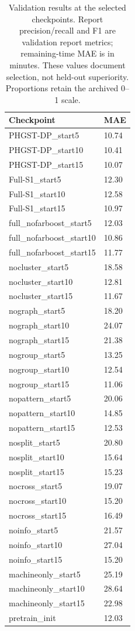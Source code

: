 \begin{table}[p]
\centering\scriptsize
\caption{Validation results at the selected checkpoints. Report precision/recall and F1 are validation report metrics; remaining-time MAE is in minutes. These values document selection, not held-out superiority. Proportions retain the archived 0--1 scale.}
\begin{tabularx}{\textwidth}{lX}
\toprule
Checkpoint & MAE \\
\midrule
PHGST-DP\_start5 & 10.74 \\
PHGST-DP\_start10 & 10.41 \\
PHGST-DP\_start15 & 10.07 \\
Full-S1\_start5 & 12.30 \\
Full-S1\_start10 & 12.58 \\
Full-S1\_start15 & 10.97 \\
full\_nofarboost\_start5 & 12.03 \\
full\_nofarboost\_start10 & 10.86 \\
full\_nofarboost\_start15 & 11.77 \\
nocluster\_start5 & 18.58 \\
nocluster\_start10 & 12.81 \\
nocluster\_start15 & 11.67 \\
nograph\_start5 & 18.20 \\
nograph\_start10 & 24.07 \\
nograph\_start15 & 21.38 \\
nogroup\_start5 & 13.25 \\
nogroup\_start10 & 12.54 \\
nogroup\_start15 & 11.06 \\
nopattern\_start5 & 20.06 \\
nopattern\_start10 & 14.85 \\
nopattern\_start15 & 12.53 \\
nosplit\_start5 & 20.80 \\
nosplit\_start10 & 15.64 \\
nosplit\_start15 & 15.23 \\
nocross\_start5 & 19.07 \\
nocross\_start10 & 15.20 \\
nocross\_start15 & 16.49 \\
noinfo\_start5 & 21.57 \\
noinfo\_start10 & 27.04 \\
noinfo\_start15 & 15.20 \\
machineonly\_start5 & 25.19 \\
machineonly\_start10 & 28.64 \\
machineonly\_start15 & 22.98 \\
pretrain\_init & 12.03 \\
\bottomrule
\end{tabularx}
\end{table}

